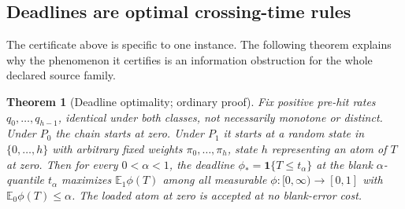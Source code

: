 \documentclass[11pt,a4paper]{article}
\theoremstyle{plain}
\newtheorem{theorem}{Theorem}[section]
\theoremstyle{definition}
\theoremstyle{remark}
\newcommand{\E}{\mathbb E}
\newcommand{\one}{\mathbf 1}
\begin{document}
\subsection{Deadlines are optimal crossing-time rules}\label{sec:mlr}
The certificate above is specific to one instance. The following theorem explains why the phenomenon it certifies is an information obstruction for the whole declared source family.

\begin{theorem}[Deadline optimality; ordinary proof]\label{thm:mlr}
Fix positive pre-hit rates $q_0,\dots,q_{h-1}$, identical under both classes, not necessarily monotone or distinct. Under $P_0$ the chain starts at zero. Under $P_1$ it starts at a random state in $\{0,\dots,h\}$ with arbitrary fixed weights $\pi_0,\dots,\pi_h$, state $h$ representing an atom of $T$ at zero. Then for every $0<\alpha<1$, the deadline $\phi_*=\one\{T\le t_\alpha\}$ at the blank $\alpha$-quantile $t_\alpha$ maximizes $\E_1\phi(T)$ among all measurable $\phi:[0,\infty)\to[0,1]$ with $\E_0\phi(T)\le\alpha$. The loaded atom at zero is accepted at no blank-error cost.
\end{theorem}
\end{document}
